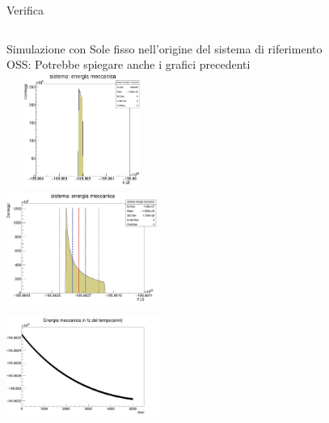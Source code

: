         \begin{frame}{Verifica}
            \begin{columns}
                    Simulazione con Sole fisso nell'origine del sistema di riferimento\\
                    OSS: Potrebbe spiegare anche i grafici precedenti\\
                    \vspace{1cm}
                    \includegraphics[width=5cm,height=3.75cm]{4_energia/peak/sf_E.jpg}\\
                    \centering        
                    \includegraphics[width=5cm,height=3.75cm]{4_energia/peak/5000.jpg}\\
                    \includegraphics[width=5cm,height=3.75cm]{4_energia/peak/5000_tempo.jpg}
                    \label{cfr::eme}      
            \end{columns}
        \end{frame}